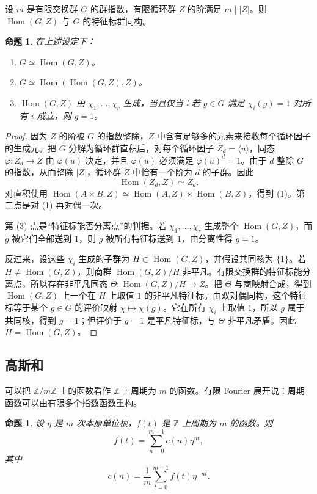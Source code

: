 \documentclass[11pt,a4paper,openany]{ctexbook}
\numberwithin{equation}{chapter}
\newcommand{\Z}{\mathbb{Z}}
\newcommand{\Hom}{\operatorname{Hom}}
\theoremstyle{plain}
\newtheorem{proposition}[theorem]{命题}
\theoremstyle{definition}
\theoremstyle{remark}
\begin{document}
设 $m$ 是有限交换群 $G$ 的群指数，有限循环群 $Z$ 的阶满足 $m\mid |Z|$。则 $\Hom(G,Z)$ 与 $G$ 的特征标群同构。

\begin{proposition}
在上述设定下：
\begin{enumerate}[label=(\arabic*)]
\item $G\simeq \Hom(G,Z)$。
\item $G\simeq \Hom(\Hom(G,Z),Z)$。
\item $\Hom(G,Z)$ 由 $\chi_1,\dots,\chi_r$ 生成，当且仅当：若 $g\in G$ 满足 $\chi_i(g)=1$ 对所有 $i$ 成立，则 $g=1$。
\end{enumerate}
\end{proposition}

\begin{proof}
因为 $Z$ 的阶被 $G$ 的指数整除，$Z$ 中含有足够多的元素来接收每个循环因子的生成元。把 $G$ 分解为循环群直积后，对每个循环因子 $Z_d=\langle u\rangle$，同态 $\varphi:Z_d\to Z$ 由 $\varphi(u)$ 决定，并且 $\varphi(u)$ 必须满足 $\varphi(u)^d=1$。由于 $d$ 整除 $G$ 的指数，从而整除 $|Z|$，循环群 $Z$ 中恰有一个阶为 $d$ 的子群。因此
\[
\Hom(Z_d,Z)\simeq Z_d.
\]
对直积使用 $\Hom(A\times B,Z)\simeq \Hom(A,Z)\times\Hom(B,Z)$，得到 (1)。第二点是对 (1) 再对偶一次。

第 (3) 点是“特征标能否分离点”的判据。若 $\chi_1,\dots,\chi_r$ 生成整个 $\Hom(G,Z)$，而 $g$ 被它们全部送到 $1$，则 $g$ 被所有特征标送到 $1$，由分离性得 $g=1$。

反过来，设这些 $\chi_i$ 生成的子群为 $H\subset\Hom(G,Z)$，并假设共同核为 $\{1\}$。若 $H\ne\Hom(G,Z)$，则商群 $\Hom(G,Z)/H$ 非平凡。有限交换群的特征标能分离点，所以存在非平凡同态 $\Theta:\Hom(G,Z)/H\to Z$。把 $\Theta$ 与商映射合成，得到 $\Hom(G,Z)$ 上一个在 $H$ 上取值 $1$ 的非平凡特征标。由双对偶同构，这个特征标等于某个 $g\in G$ 的评价映射 $\chi\mapsto\chi(g)$。它在所有 $\chi_i$ 上取值 $1$，所以 $g$ 属于共同核，得到 $g=1$；但评价于 $g=1$ 是平凡特征标，与 $\Theta$ 非平凡矛盾。因此 $H=\Hom(G,Z)$。
\end{proof}

\subsection{高斯和}

可以把 $\Z/m\Z$ 上的函数看作 $\Z$ 上周期为 $m$ 的函数。有限 Fourier 展开说：周期函数可以由有限多个指数函数重构。

\begin{proposition}
设 $\eta$ 是 $m$ 次本原单位根，$f(t)$ 是 $\Z$ 上周期为 $m$ 的函数。则
\[
f(t)=\sum_{n=0}^{m-1}c(n)\eta^{nt},
\]
其中
\[
c(n)=\frac1m\sum_{t=0}^{m-1}f(t)\eta^{-nt}.
\]
\end{proposition}
\end{document}
